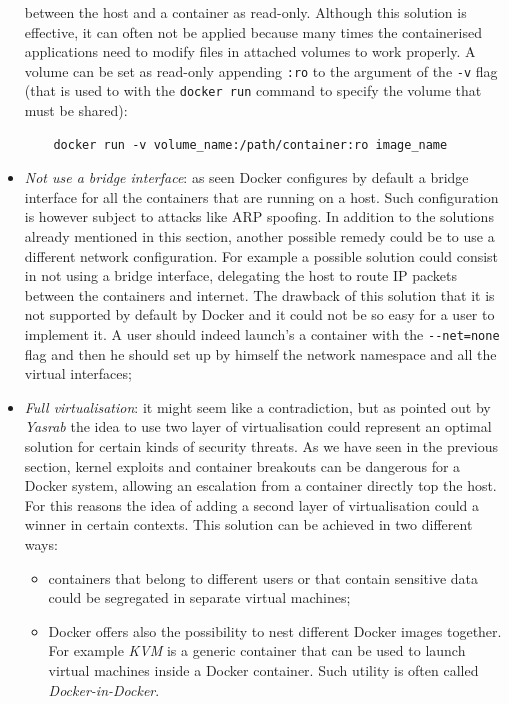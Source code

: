 \documentclass[a4paper,12pt]{article}
\newcommand{\code}[1]{\lstinline|#1|}
\begin{document}
\begin{itemize}
  between the host and a container as read-only. Although this solution is
  effective, it can often not be applied because many times the containerised
  applications need to modify files in attached volumes to work properly. A
  volume can be set as read-only appending \code{:ro} to the argument of the
  \code{-v} flag (that is used to with the \code{docker run} command to
  specify the volume that must be shared): 
  \begin{lstlisting}
    docker run -v volume_name:/path/container:ro image_name
  \end{lstlisting}
  \item \textit{Not use a bridge interface}: as seen Docker configures by
  default a bridge interface for all the containers that are running on a host.
  Such configuration is however subject to attacks like ARP spoofing. In
  addition to the solutions already mentioned in this section, another possible
  remedy could be to use a different network configuration. For example a
  possible solution could consist in not using a bridge interface, delegating
  the host to route IP packets between the containers and internet. The drawback
  of this solution that it is not supported by default by Docker and it could
  not be so easy for a user to implement it. A user should indeed launch's a
  container with the \code{--net=none} flag and then he should set up by
  himself the network namespace and all the virtual interfaces;
  \item \textit{Full virtualisation}: it might seem like a contradiction, but as
  pointed out by \textit{Yasrab}
  \cite[Sec.~5.2.13]{mitigating_docker_security_issues_yasrab} the idea to use
  two layer of virtualisation could represent an optimal solution for certain
  kinds of security threats. As we have seen in the previous section, kernel
  exploits and container breakouts can be dangerous for a Docker system,
  allowing an escalation from a container directly top the host. For this
  reasons the idea of adding a second layer of virtualisation could a winner in
  certain contexts. This solution can be achieved in two different ways: 
  \begin{itemize}
    \item containers that belong to different users or that contain sensitive
    data could be segregated in separate virtual machines;
    \item Docker offers also the possibility to nest different Docker images
    together. For example \textit{KVM} \cite{kvm} is a generic container that
    can be used to launch virtual machines inside a Docker container. Such
    utility is often called \textit{Docker-in-Docker}.
  \end{itemize} 
\end{itemize}
\end{document}
